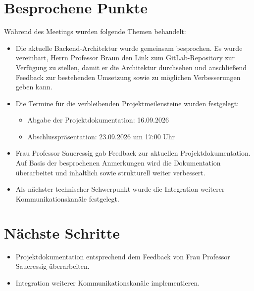 \documentclass[a4paper,11pt]{article}
\begin{document}
\vspace{0.5cm}

\section{Besprochene Punkte}

Während des Meetings wurden folgende Themen behandelt:

\begin{itemize}[leftmargin=1.2cm]

\item Die aktuelle Backend-Architektur wurde gemeinsam besprochen. Es wurde vereinbart, Herrn Professor Braun den Link zum GitLab-Repository zur Verfügung zu stellen, damit er die Architektur durchsehen und anschließend Feedback zur bestehenden Umsetzung sowie zu möglichen Verbesserungen geben kann.

\item Die Termine für die verbleibenden Projektmeilensteine wurden festgelegt:
\begin{itemize}
    \item Abgabe der Projektdokumentation: 16.09.2026
    \item Abschlusspräsentation: 23.09.2026 um 17:00 Uhr
\end{itemize}

\item Frau Professor Saueressig gab Feedback zur aktuellen Projektdokumentation. Auf Basis der besprochenen Anmerkungen wird die Dokumentation überarbeitet und inhaltlich sowie strukturell weiter verbessert.
\item Als nächster technischer Schwerpunkt wurde die Integration weiterer Kommunikationskanäle festgelegt.

\end{itemize}

\vspace{0.5cm}

\section{Nächste Schritte}

\begin{itemize}[leftmargin=1.2cm]

\item Projektdokumentation entsprechend dem Feedback von Frau Professor Saueressig überarbeiten.

\item Integration weiterer Kommunikationskanäle implementieren.

\end{itemize}
\end{document}
